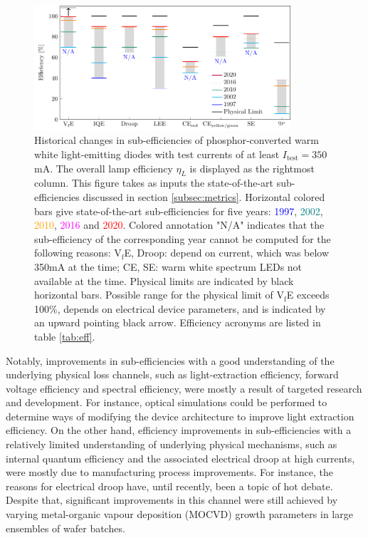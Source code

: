 \documentclass[a4paper,nocompress]{spie}  %
\begin{document}
    \begin{figure} [ht]
        \begin{center}
            \includegraphics[width=0.85\textwidth]{breakthroughs_efficiency.pdf}
        \end{center}
        \caption{Historical changes in sub-efficiencies of phosphor-converted warm white light-emitting diodes with test currents of at least $I_\text{test}=350$mA. The overall lamp efficiency $\eta_L$ is displayed as the rightmost column. This figure takes as inputs the state-of-the-art sub-efficiencies discussed in section \ref{subsec:metrics}. Horizontal colored bars give state-of-the-art sub-efficiencies for five years: \textcolor{blue}{1997}, \textcolor{teal}{2002}, \textcolor{orange}{2010}, \textcolor{magenta}{2016} and \textcolor{red}{2020}. Colored annotation "N/A" indicates that the sub-efficiency of the corresponding year cannot be computed for the following reasons: V$_\text{f}$E, Droop: depend on current, which was below 350mA at the time; CE, SE: warm white spectrum LEDs not available at the time. Physical limits are indicated by black horizontal bars. Possible range for the physical limit of V$_\text{f}$E exceeds 100\%, depends on electrical device parameters, and is indicated by an upward pointing black arrow. Efficiency acronyms are listed in table \ref{tab:eff}.}
        \label{fig:efficiency}
    \end{figure}
    
    Notably, improvements in sub-efficiencies with a good understanding of the underlying physical loss channels, such as light-extraction efficiency, forward voltage efficiency and spectral efficiency, were mostly a result of targeted research and development. For instance, optical simulations could be performed to determine ways of modifying the device architecture to improve light extraction efficiency. On the other hand, efficiency improvements in sub-efficiencies with a relatively limited understanding of underlying physical mechanisms, such as internal quantum efficiency and the associated electrical droop at high currents, were mostly due to manufacturing process improvements. For instance, the reasons for electrical droop have, until recently, been a topic of hot debate. Despite that, significant improvements in this channel were still achieved by varying metal-organic vapour deposition (MOCVD) growth parameters in large ensembles of wafer batches.
\end{document}
